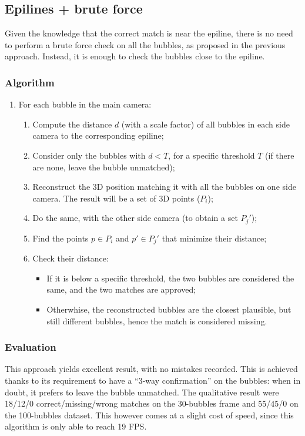 \subsection{Epilines + brute force}
\label{sec:match:epi-bruteforce}

Given the knowledge that the correct match is near the epiline, there is no need to perform a brute force check on all the bubbles, as proposed in the previous approach.
Instead, it is enough to check the bubbles close to the epiline.

\subsubsection{Algorithm}

\begin{enumerate}
	\itemsep 0em
	\item For each bubble in the main camera:
	      \begin{enumerate}
		      \item Compute the distance $d$ (with a scale factor) of all bubbles in each side camera to the corresponding epiline;
		      \item Consider only the bubbles with $d<T$, for a specific threshold $T$ (if there are none, leave the bubble unmatched);
		      \item Reconstruct the 3D position matching it with all the bubbles on one side camera. The result will be a set of 3D points ($P_i$);
		      \item Do the same, with the other side camera (to obtain a set $P_j'$);
		      \item Find the points $p\in P_i$ and $p'\in P_j'$ that minimize their distance;
		      \item Check their distance:
		            \begin{itemize}
			            \item If it is below a specific threshold, the two bubbles are considered the same, and the two matches are approved;
			            \item Otherwhise, the reconstructed bubbles are the closest plausible, but still different bubbles, hence the match is considered missing.
		            \end{itemize}
	      \end{enumerate}
\end{enumerate}

\subsubsection{Evaluation}

This approach yields excellent result, with no mistakes recorded.
This is achieved thanks to its requirement to have a ``3-way confirmation'' on the bubbles: when in doubt, it prefers to leave the bubble unmatched.
The qualitative result were 18/12/0 correct/missing/wrong matches on the 30-bubbles frame and 55/45/0 on the 100-bubbles dataset.
This however comes at a slight cost of speed, since this algorithm is only able to reach 19 FPS.
